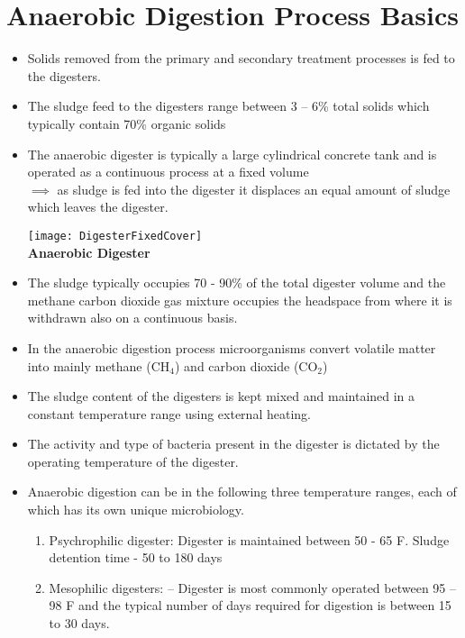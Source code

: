 \documentclass{article}
\begin{document}
\section{Anaerobic Digestion Process Basics}

		\begin{itemize}
		\item Solids removed from the primary and secondary treatment processes is fed to the digesters.  
		\item The sludge feed to the digesters range between 3 – 6\% total solids which typically contain 70\% organic solids
		\item The anaerobic digester is typically a large cylindrical concrete tank and is operated as a continuous process at a fixed volume\\ $\implies$ as sludge is fed into the digester it displaces an equal amount of sludge which leaves the digester.
\begin{center}
\texttt{[image: DigesterFixedCover]}\\
\textbf{Anaerobic Digester}\\
\end{center}
		\item The sludge typically occupies 70 - 90\% of the total digester volume and the methane carbon dioxide gas mixture occupies the headspace from where it is withdrawn also on a continuous basis.
		\item In the anaerobic digestion process microorganisms convert volatile matter into mainly methane (CH$_4$) and carbon dioxide (CO$_2$)
		\item The sludge content of the digesters is kept mixed and maintained in a constant temperature range using external heating.
		\item The activity and type of bacteria present in the digester is dictated by the operating temperature of the digester.
		\item Anaerobic digestion can be in the following three temperature ranges, each of which has its own unique microbiology.\\
			\begin{enumerate}[1. ]
			\item Psychrophilic digester:  Digester is maintained between 50  - 65 F.  Sludge detention time - 50 to 180 days
			\item Mesophilic digesters: – Digester is most commonly operated  between 95 – 98 F and the typical number of days required for digestion is between 15 to 30 days.\\

\end{enumerate}
\end{itemize}
\end{document}
